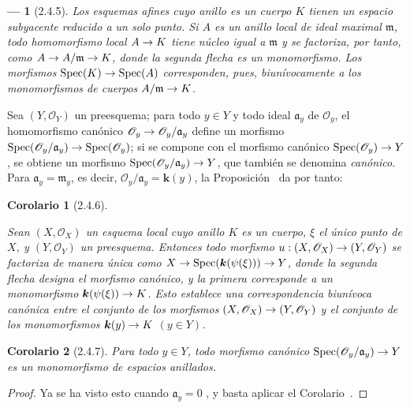 \documentclass[oneside]{amsart}
\theoremstyle{ega-env-style}
\newtheorem*{env}{---}
\theoremstyle{ega-thm-env-style}
\newtheorem*{corollary}{Corolario}
\theoremstyle{ega-defn-env-style}
\renewcommand{\to}{\mathchoice{\longrightarrow}{\rightarrow}{\rightarrow}{\rightarrow}}
\newcommand{\oldpage}[2][]{{\marginnote{\normalfont{\textbf{#1}~|~#2}}}\ignorespaces}
\let\EGAOriginalLabel\label
\renewcommand{\label}[1]{\phantomsection\EGAOriginalLabel{#1}}
\begin{document}
\begin{env}[2.4.5]
\label{I.2.4.5}
Los esquemas afines cuyo anillo es un cuerpo $K$ tienen un espacio subyacente reducido a un solo punto.
Si $A$ es un anillo local de ideal maximal $\mathfrak{m}$, todo homomorfismo local $A\to K$ tiene núcleo igual a $\mathfrak{m}$ y se factoriza, por tanto, como $A\to A/\mathfrak{m}\to K$, donde la segunda flecha es un monomorfismo.
Los morfismos $\operatorname{Spec}(K)\to\operatorname{Spec}(A)$ corresponden, pues, biunívocamente a los monomorfismos de cuerpos $A/\mathfrak{m}\to K$.
\end{env}

Sea $(Y,\mathscr{O}_Y)$ un preesquema;
para todo $y\in Y$ y todo ideal $\mathfrak{a}_y$ de $\mathscr{O}_y$, el homomorfismo canónico $\mathscr{O}_y\to\mathscr{O}_y/\mathfrak{a}_y$ define un morfismo $\operatorname{Spec}(\mathscr{O}_y/\mathfrak{a}_y)
\to\operatorname{Spec}(\mathscr{O}_y)$;
si se compone con el morfismo canónico $\operatorname{Spec}(\mathscr{O}_y)\to Y$, se obtiene un morfismo $\operatorname{Spec}(\mathscr{O}_y/\mathfrak{a}_y)\to Y$, que también se denomina \textit{canónico}.
Para $\mathfrak{a}_y=\mathfrak{m}_y$, es decir, $\mathscr{O}_y/\mathfrak{a}_y=\boldsymbol{k}(y)$, la Proposición~ da por tanto:


\oldpage[I]{103}
\begin{corollary}[2.4.6]
\label{I.2.4.6}

Sean $(X,\mathscr{O}_X)$ un esquema local cuyo anillo $K$ es un cuerpo, $\xi$ el único punto de $X$, y $(Y,\mathscr{O}_Y)$ un preesquema.
Entonces todo morfismo $u:(X,\mathscr{O}_X)\to(Y,\mathscr{O}_Y)$ se factoriza de manera única como $X\to\operatorname{Spec}(\boldsymbol{k}(\psi(\xi)))\to Y$, donde la segunda flecha designa el morfismo canónico, y la primera corresponde a un monomorfismo $\boldsymbol{k}(\psi(\xi))\to K$.
Esto establece una correspondencia biunívoca canónica entre el conjunto de los morfismos $(X,\mathscr{O}_X)\to(Y,\mathscr{O}_Y)$ y el conjunto de los monomorfismos $\boldsymbol{k}(y)\to K$ $(y\in Y)$.
\end{corollary}

\begin{corollary}[2.4.7]
\label{I.2.4.7}
Para todo $y\in Y$, todo morfismo canónico $\operatorname{Spec}(\mathscr{O}_y/\mathfrak{a}_y)\to Y$ es un monomorfismo de espacios anillados.
\end{corollary}

\begin{proof}
Ya se ha visto esto cuando $\mathfrak{a}_y=0$ , y basta aplicar el Corolario~.
\end{proof}
\end{document}
